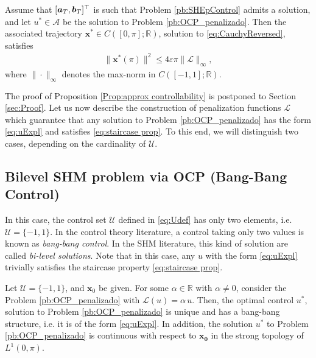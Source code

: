\documentclass[twocolumn]{autart}    %
\begin{document}
\bigskip

\begin{proposition}\label{Prop:approx controllability}
Assume that $[\bm{a}_T,\bm{b}_T]^\top$ is such that Problem \ref{pb:SHEpControl} admits a solution, and let $u^\ast\in \mathcal A$ be the solution to Problem \ref{pb:OCP_penalizado}. Then the associated trajectory $\bm{x}^\ast\in C([0,\pi];\mathbb{R})$, solution to \eqref{eq:CauchyReversed}, satisfies
\begin{align*} 
	\| \bm{x}^\ast (\pi)  \|^2 \leq  4 \varepsilon \pi \| \mathcal{L}\|_\infty,
\end{align*}
where $\| \cdot\|_\infty$ denotes the max-norm in $C([-1,1]; \mathbb{R})$.
\end{proposition}

The proof of Proposition \ref{Prop:approx controllability} is postponed to Section \ref{sec:Proof}. Let us now describe the construction of penalization functions $\mathcal{L}$ which guarantee that any solution to Problem \ref{pb:OCP_penalizado} has the form \eqref{eq:uExpl} and satisfies \eqref{eq:staircase prop}. To this end, we will distinguish two cases, depending on the cardinality of $\mathcal{U}$.

\subsection{Bilevel SHM problem via OCP (Bang-Bang Control)} 

In this case, the control set $\mathcal{U}$ defined in \eqref{eq:Udef} has only two elements, i.e.  $\mathcal{U}=\{-1,1\}$.
In the control theory literature, a control taking only two values is known as \emph{bang-bang control}. In the SHM literature, this kind of solution are called \textit{bi-level solutions}. Note that in this case, any $u$ with the form \eqref{eq:uExpl}  trivially satisfies the staircase property \eqref{eq:staircase prop}.

\medskip

\begin{theorem}\label{th:bang-bang}
Let $\mathcal{U}=\{ -1, 1\}$, and $\bm{x}_0$ be given.  For some $\alpha\in \mathbb{R}$ with $\alpha\neq 0$, consider the Problem \ref{pb:OCP_penalizado} with $\mathcal{L} (u) = \alpha\, u$.
Then, the optimal control $u^\ast$, solution to Problem \ref{pb:OCP_penalizado} is unique and has a bang-bang structure, i.e. it is of the form \eqref{eq:uExpl}.
In addition, the solution $u^\ast$ to Problem \ref{pb:OCP_penalizado} is continuous  with respect to $\bm{x_0}$ in the strong topology of $L^1(0,\pi)$.
\end{theorem}
\end{document}
